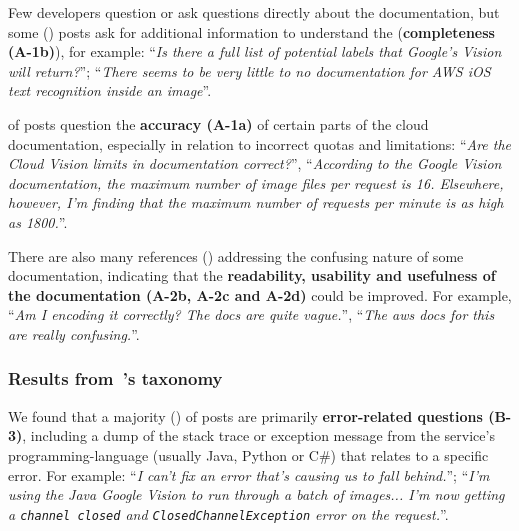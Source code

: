 %

Few developers question or ask questions directly about the  documentation, but some (\PctTaxACompleteness{}) posts ask for additional information to understand the  (\textbf{completeness (A-1b)}), for example: ``\textit{Is there a full list of potential labels that Google's Vision  will return?}''; ``\textit{There seems to be very little to no documentation for AWS iOS text recognition inside an image}''.

\PctTaxACorrectness{} of posts question the \textbf{accuracy (A-1a)} of certain parts of the cloud documentation, especially in relation to incorrect quotas and limitations: ``\textit{Are the Cloud Vision  limits in documentation correct?}'', ``\textit{According to the Google Vision documentation, the maximum number of image files per request is 16. Elsewhere, however, I'm finding that the maximum number of requests per minute is as high as 1800.}''.

There are also many references (\PctTaxADocumentation{}) addressing the confusing nature of some documentation, indicating that the \textbf{readability, usability and usefulness of the documentation (A-2b, A-2c and A-2d)} could be improved. For example, ``\textit{Am I encoding it correctly? The docs are quite vague.}'', ``\textit{The aws docs for this are really confusing.}''.

\subsubsection{Results from~\citeauthor{Beyer:2018fm}'s taxonomy}
\label{icse2020:sub:sub:resultsB}

%
We found that a majority (\PctTaxBErrors{}) of posts are primarily \textbf{error-related questions (B-3)}, including a dump of the stack trace or exception message from the service's programming-language  (usually Java, Python or C\#) that relates to a specific error. For example: ``\textit{I can't fix an error that's causing us to fall behind.}''; ``\textit{I'm using the Java Google Vision  to run through a batch of images... I'm now getting a \texttt{channel closed} and \texttt{ClosedChannelException} error on the request.}''.

